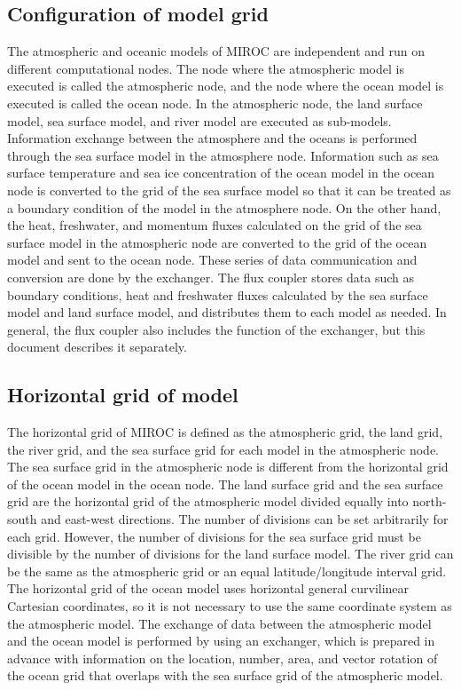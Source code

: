 \hypertarget{configuration-of-model-grid}{%
\subsection{Configuration of model
grid}\label{configuration-of-model-grid}}

The atmospheric and oceanic models of MIROC are independent and run on
different computational nodes. The node where the atmospheric model is
executed is called the atmospheric node, and the node where the ocean
model is executed is called the ocean node. In the atmospheric node, the
land surface model, sea surface model, and river model are executed as
sub-models. Information exchange between the atmosphere and the oceans
is performed through the sea surface model in the atmosphere node.
Information such as sea surface temperature and sea ice concentration of
the ocean model in the ocean node is converted to the grid of the sea
surface model so that it can be treated as a boundary condition of the
model in the atmosphere node. On the other hand, the heat, freshwater,
and momentum fluxes calculated on the grid of the sea surface model in
the atmospheric node are converted to the grid of the ocean model and
sent to the ocean node. These series of data communication and
conversion are done by the exchanger. The flux coupler stores data such
as boundary conditions, heat and freshwater fluxes calculated by the sea
surface model and land surface model, and distributes them to each model
as needed. In general, the flux coupler also includes the function of
the exchanger, but this document describes it separately.

\hypertarget{horizontal-grid-of-model}{%
\subsection{Horizontal grid of model}\label{horizontal-grid-of-model}}

The horizontal grid of MIROC is defined as the atmospheric grid, the
land grid, the river grid, and the sea surface grid for each model in
the atmospheric node. The sea surface grid in the atmospheric node is
different from the horizontal grid of the ocean model in the ocean node.
The land surface grid and the sea surface grid are the horizontal grid
of the atmospheric model divided equally into north-south and east-west
directions. The number of divisions can be set arbitrarily for each
grid. However, the number of divisions for the sea surface grid must be
divisible by the number of divisions for the land surface model. The
river grid can be the same as the atmospheric grid or an equal
latitude/longitude interval grid. The horizontal grid of the ocean model
uses horizontal general curvilinear Cartesian coordinates, so it is not
necessary to use the same coordinate system as the atmospheric model.
The exchange of data between the atmospheric model and the ocean model
is performed by using an exchanger, which is prepared in advance with
information on the location, number, area, and vector rotation of the
ocean grid that overlaps with the sea surface grid of the atmospheric
model.

